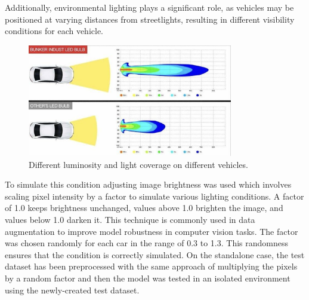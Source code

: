 Additionally, environmental lighting plays a significant role, as vehicles may be positioned at varying distances 
from streetlights, resulting in different visibility conditions for each vehicle.

\begin{figure}[H]
    \centering
    \includegraphics[width=0.8\textwidth]{images/figure10.png}
    \caption{Different luminosity and light coverage on different vehicles.}
    \label{fig:fig9}
  \end{figure}

  To simulate this condition adjusting image brightness was used which involves scaling pixel 
  intensity by a factor to simulate various lighting conditions. 
  A factor of 1.0 keeps brightness unchanged, values above 1.0 brighten the image, and values below 1.0 darken it.
   This technique is commonly used in data augmentation to improve model robustness in computer vision tasks.
   The factor was chosen randomly for each car in the range of 0.3 to 1.3. This randomness ensures that the condition is 
   correctly simulated.
   On the standalone case, the test dataset has been preprocessed with the same approach of multiplying the pixels by a random
   factor and then the model was tested in an isolated environment using the newly-created test dataset. 

